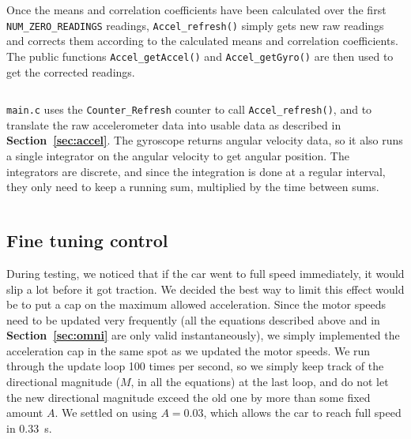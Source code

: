 \documentclass[letterpaper, 11pt]{article}
\newcommand*{\secref}[1]{\textbf{Section~\ref{#1}}}
\begin{document}
\begin{enumerate}[label=\textbf{\arabic*.}]
Once the means and correlation coefficients have been calculated over the first \verb|NUM_ZERO_READINGS| readings, \verb|Accel_refresh()| simply gets new raw readings and corrects them according to the calculated means and correlation coefficients. The public functions \verb|Accel_getAccel()| and \verb|Accel_getGyro()| are then used to get the corrected readings.

\begin{mdframed}[backgroundcolor=bg]
    \inputminted[breaklines]{c}{files/excerpts/Accel_refresh.c}
\end{mdframed}

\verb|main.c| uses the \verb|Counter_Refresh| counter to call \verb|Accel_refresh()|, and to translate the raw accelerometer data into usable data as described in \secref{sec:accel}. The gyroscope returns angular velocity data, so it also runs a single integrator on the angular velocity to get angular position. The integrators are discrete, and since the integration is done at a regular interval, they only need to keep a running sum, multiplied by the time between sums.

\begin{mdframed}[backgroundcolor=bg]
    \inputminted[breaklines]{c}{files/excerpts/accel_gyro_handling.c}
\end{mdframed}

\subsection{Fine tuning control}
During testing, we noticed that if the car went to full speed immediately, it would slip a lot before it got traction. We decided the best way to limit this effect would be to put a cap on the maximum allowed acceleration. Since the motor speeds need to be updated very frequently (all the equations described above and in \secref{sec:omni} are only valid instantaneously), we simply implemented the acceleration cap in the same spot as we updated the motor speeds. We run through the update loop 100 times per second, so we simply keep track of the directional magnitude ($M$, in all the equations) at the last loop, and do not let the new directional magnitude exceed the old one by more than some fixed amount $A$. We settled on using $A = 0.03$, which allows the car to reach full speed in \SI{0.33}{s}.

\begin{mdframed}[backgroundcolor=bg]
    \inputminted[breaklines]{c}{files/excerpts/accelLimit.c}
\end{mdframed}


\end{enumerate}
\end{document}
